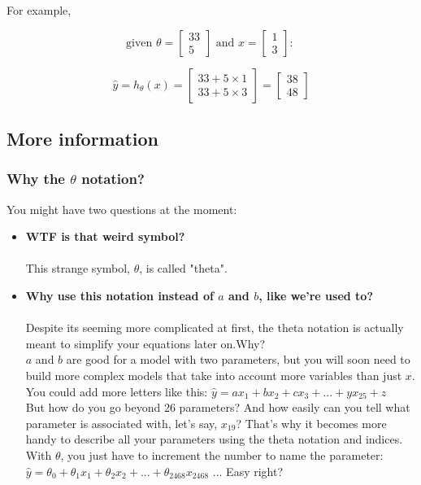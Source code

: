 For example,

$$
\text{given } \theta = \begin{bmatrix}33 \\ 5 \end{bmatrix} \text{ and } x = \begin{bmatrix}1 \\ 3 \end{bmatrix} \text{: }
$$

$$
\hat{y} = h_{\theta}(x) = \begin{bmatrix} 33 +  5 \times 1 \\ 33 + 5 \times 3\end{bmatrix}  = \begin{bmatrix} 38 \\ 48 \end{bmatrix} 
$$

\newpage

\subsection*{More information}

\subsubsection*{Why the $\theta$ notation?}

You might have two questions at the moment:
\begin{itemize}
    \item \textbf{WTF is that weird  symbol?}\\
    \\
    This strange symbol, $\theta$, is called "theta".
    \\
    \item \textbf{Why use this notation instead of $a$ and $b$, like we're used to?}\\
    \\
    Despite its seeming more complicated at first, the theta notation is actually meant to simplify your equations later on.Why?\\
    \newline
    $a$ and $b$ are good for a model with two parameters, but you will soon need to build more complex models that take into account more variables than just $x$.\\
    You could add more letters like this:  $\hat{y} = ax_1 + bx_2 + cx_3 + ... + yx_{25} + z$\\
    \newline
    But how do you go beyond 26 parameters? And how easily can you tell what parameter is associated with, let's say, $x_{19}$? That's why it becomes more handy to describe all your parameters using the theta notation and indices.\\
    \newline
    With $\theta$, you just have to increment the number to name the parameter:\\
    \newline
                      $\hat{y} = \theta_0 + \theta_1 x_1 + \theta_2 x_2 + ... + \theta_{2468} x_{2468}$ ... Easy right?
\end{itemize}


